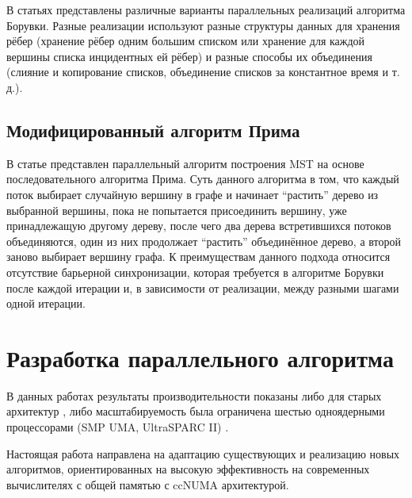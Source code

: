 \documentclass{article}
\begin{document}
В статьях \cite{dense-mst,boruvka-prima,boruvka-cm5} представлены различные варианты параллельных реализаций алгоритма Борувки.
Разные реализации используют разные структуры данных для хранения рёбер (хранение рёбер одним большим списком или хранение для каждой вершины списка инцидентных ей рёбер) и разные способы их объединения (слияние и копирование списков, объединение списков за константное время и т. д.).

\subsection{Модифицированный алгоритм Прима}
В статье \cite{boruvka-prima} представлен параллельный алгоритм построения MST на основе последовательного алгоритма Прима.
Суть данного алгоритма в том, что каждый поток выбирает случайную вершину в графе и начинает ``растить'' дерево из выбранной вершины, пока не попытается присоединить вершину, уже принадлежащую другому дереву, после чего два дерева встретившихся потоков объединяются, один из них продолжает ``растить'' объединённое дерево, а второй заново выбирает вершину графа. %
К преимуществам данного подхода относится отсутствие барьерной синхронизации, которая требуется в алгоритме Борувки после каждой итерации и, в зависимости от реализации, между разными шагами одной итерации.

\newpage
\section{Разработка параллельного алгоритма}
В данных работах \cite{dense-mst,boruvka-prima,boruvka-cm5} результаты производительности показаны либо для старых архитектур \cite{dense-mst,boruvka-cm5}, либо масштабируемость была ограничена шестью одноядерными процессорами (SMP  UMA, UltraSPARC II) \cite{boruvka-prima} .

Настоящая работа направлена на адаптацию существующих и реализацию новых алгоритмов, ориентированных на высокую эффективность на современных вычислителях с общей памятью с ccNUMA архитектурой.
\end{document}
